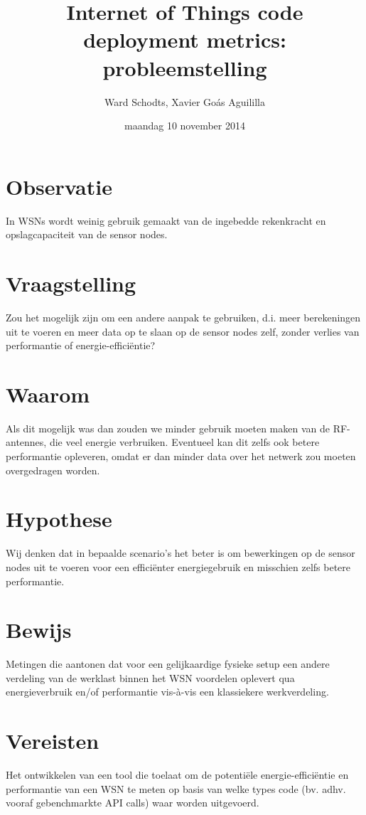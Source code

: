 \documentclass[11pt]{article}
\author{Ward Schodts, Xavier Goás Aguililla}
\date{maandag 10 november 2014}
\title{Internet of Things code deployment metrics: probleemstelling}
\begin{document}
\maketitle

\section{Observatie}
\label{sec-1}
In WSNs wordt weinig gebruik gemaakt van de ingebedde rekenkracht en
opslagcapaciteit van de sensor nodes.
\section{Vraagstelling}
\label{sec-2}
Zou het mogelijk zijn om een andere aanpak te gebruiken, d.i. meer
berekeningen uit te voeren en meer data op te slaan op de sensor nodes
zelf, zonder verlies van performantie of energie-efficiëntie?
\section{Waarom}
\label{sec-3}
Als dit mogelijk was dan zouden we minder gebruik moeten maken van de
RF-antennes, die veel energie verbruiken. Eventueel kan dit zelfs ook
betere performantie opleveren, omdat er dan minder data over het
netwerk zou moeten overgedragen worden.
\section{Hypothese}
\label{sec-4}
Wij denken dat in bepaalde scenario's het beter is om bewerkingen op
de sensor nodes uit te voeren voor een efficiënter energiegebruik en
misschien zelfs betere performantie.
\section{Bewijs}
\label{sec-5}
Metingen die aantonen dat voor een gelijkaardige fysieke setup een
andere verdeling van de werklast binnen het WSN voordelen oplevert qua
energieverbruik en/of performantie vis-à-vis een klassiekere
werkverdeling.
\section{Vereisten}
\label{sec-6}
Het ontwikkelen van een tool die toelaat om de potentiële
energie-efficiëntie en performantie van een WSN te meten op basis van
welke types code (bv. adhv. vooraf gebenchmarkte API calls) waar
worden uitgevoerd.
\end{document}

